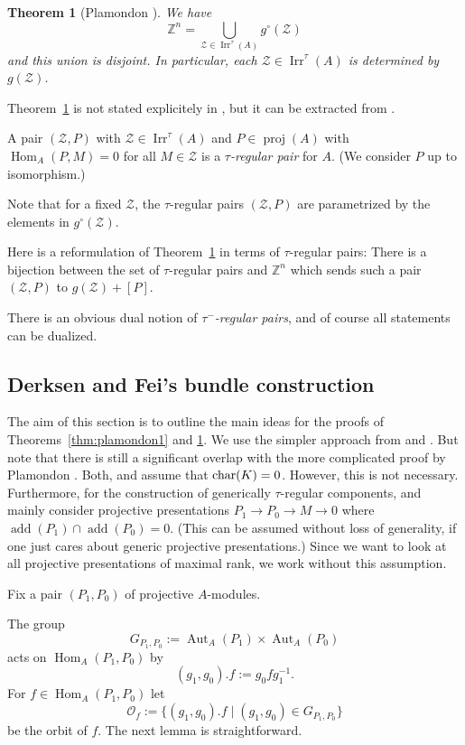 \documentclass[12pt,reqno]{amsart}
\newtheorem{Thm}{Theorem}[section]
\theoremstyle{definition}
\newcommand{\Z}{\mathbb{Z}}
\newcommand{\cO}{{\mathcal O}}
\newcommand{\add}{\operatorname{add}}
\newcommand{\proj}{\operatorname{proj}}
\newcommand{\Hom}{\operatorname{Hom}}
\newcommand{\Aut}{\operatorname{Aut}}
\newcommand{\irr}{\operatorname{Irr}}
\newcommand{\calZ}{\mathcal{Z}}
\begin{document}
\begin{Thm}[{Plamondon \cite{P13}}]\label{thm:plamondon2}
We have
$$
\Z^n = \bigcup_{\calZ \in \irr^\tau(A)} g^\circ(\calZ)
$$
and this union is disjoint.
In particular, each $\calZ \in \irr^\tau(A)$ is determined by
$g(\calZ)$.
\end{Thm}


Theorem~\ref{thm:plamondon2} is not stated
explicitely in \cite{P13}, but it can be extracted from \cite[Theorem~1.2]{P13}.

A pair $(\calZ,P)$ with $\calZ \in \irr^\tau(A)$ and $P \in \proj(A)$ with
$\Hom_A(P,M) = 0$ for all $M \in \calZ$ is a \emph{$\tau$-regular pair}
for $A$.
(We consider $P$ up to isomorphism.)

Note that
for a fixed $\calZ$, the $\tau$-regular pairs $(\calZ,P)$ are parametrized
by the elements in $g^\circ(\calZ)$.

Here is a reformulation of Theorem~\ref{thm:plamondon2} in
terms of $\tau$-regular pairs:
There is a bijection between the set of $\tau$-regular pairs
and $\Z^n$ which sends such a pair $(\calZ,P)$ to $g(\calZ)+[P]$.

There is an obvious dual notion of \emph{$\tau^-$-regular pairs}, and
of course all statements can be dualized.

\subsection{Derksen and Fei's bundle construction}
\label{subsec:bundle}
The aim of this section is to outline the main ideas for the proofs
of Theorems~\ref{thm:plamondon1} and
\ref{thm:plamondon2}.
We use the simpler approach from \cite{DF15} and \cite{F23}.
But note that there is still a significant overlap with the more complicated proof by Plamondon \cite{P13}.
Both, \cite{P13} and \cite{DF15} assume that ${\rm char}(K) = 0$.
However, this is not necessary.
Furthermore, for the construction of generically $\tau$-regular components, \cite{F23} and \cite{P13} mainly consider
projective presentations
$P_1 \to P_0 \to M \to 0$
where $\add(P_1) \cap \add(P_0) = 0$.
(This can be assumed without loss of generality, if one just cares about
generic projective presentations.)
Since we want to look at all projective presentations of maximal rank,
we work without this assumption.

Fix a pair $(P_1,P_0)$ of projective $A$-modules.

The group
$$
G_{P_1,P_0} := \Aut_A(P_1) \times \Aut_A(P_0)
$$
acts on $\Hom_A(P_1,P_0)$ by
$$
(g_1,g_0).f := g_0fg_1^{-1}.
$$
For $f \in \Hom_A(P_1,P_0)$ let
$$
\cO_f := \{ (g_1,g_0).f \mid (g_1,g_0) \in G_{P_1,P_0} \}
$$
be the orbit of $f$.
The next lemma is straightforward.
\end{document}
